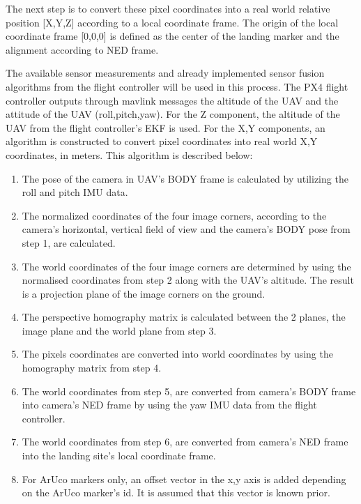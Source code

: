 \documentclass[conference]{IEEEtran}
\begin{document}
The next step is to convert these pixel coordinates into a real world relative position [X,Y,Z] according to a local coordinate frame. The origin of the local coordinate frame [0,0,0] is defined as the center of the landing marker and the alignment according to NED frame. 

The available sensor measurements and already implemented sensor fusion algorithms from the flight controller will be used in this process. The PX4 flight controller outputs through mavlink messages the altitude of the UAV and the attitude of the UAV (roll,pitch,yaw). For the Z component, the altitude of the UAV from the flight controller's EKF is used. For the X,Y components, an algorithm is constructed to convert pixel coordinates into real world X,Y coordinates, in meters. This algorithm is described below:

\begin{enumerate}

\item The pose of the camera in UAV's BODY frame is calculated by utilizing the roll and pitch IMU data.

\item The normalized coordinates of the four image corners, according to the camera's horizontal, vertical field of view and the camera's BODY pose from step 1, are calculated.

\item The world coordinates of the four image corners are determined by using the normalised coordinates from step 2 along with the UAV's altitude. The result is a projection plane of the image corners on the ground.

\item The perspective homography matrix is calculated between the 2 planes, the image plane and the world plane from step 3.

\item The pixels coordinates are converted into world coordinates by using the homography matrix from step 4.

\item The world coordinates from step 5, are converted from camera's BODY frame into camera's NED frame by using the yaw IMU data from the flight controller.

\item The world coordinates from step 6, are converted from camera's NED frame into the landing site's local coordinate frame.

\item For ArUco markers only, an offset vector in the x,y axis is added depending on the ArUco marker's id. It is assumed that this vector is known prior.


\end{enumerate}
\end{document}
